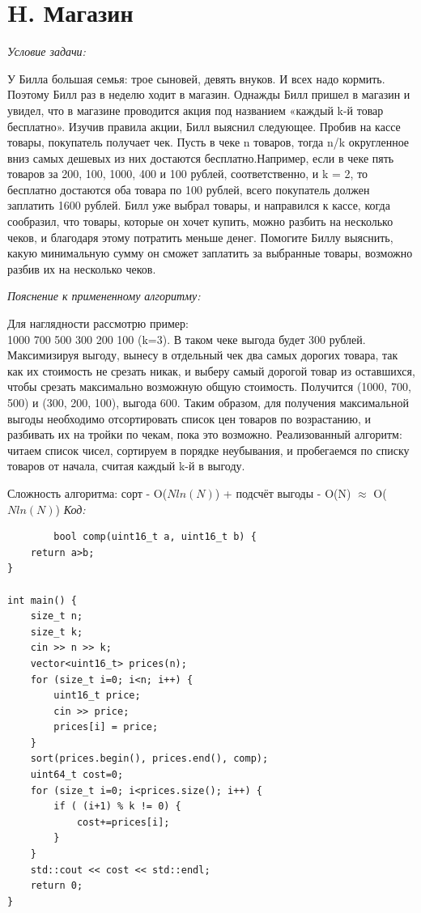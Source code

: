 \section{H. Магазин}
\textit{Условие задачи:} \par
У Билла большая семья: трое сыновей, девять внуков. И всех надо кормить. Поэтому Билл раз в неделю ходит в магазин.
Однажды Билл пришел в магазин и увидел, что в магазине проводится акция под названием «каждый k-й товар бесплатно».
Изучив правила акции, Билл выяснил следующее. Пробив на кассе товары, покупатель получает чек. Пусть в чеке n товаров,
тогда n/k округленное вниз самых дешевых из них достаются бесплатно.Например, если в чеке пять товаров за 200, 100, 1000,
400 и 100 рублей, соответственно, и k = 2, то бесплатно достаются оба товара по 100 рублей, всего покупатель должен заплатить 1600 рублей.
Билл уже выбрал товары, и направился к кассе, когда сообразил, что товары, которые он хочет купить, можно разбить на несколько
чеков, и благодаря этому потратить меньше денег. Помогите Биллу выяснить, какую минимальную сумму он сможет заплатить за
выбранные товары, возможно разбив их на несколько чеков.\par
\textit{Пояснение к примененному алгоритму:} \par
Для наглядности рассмотрю пример:\\
1000 700 500 300 200 100 (k=3). В таком чеке выгода будет 300 рублей. Максимизируя выгоду, вынесу в отдельный чек два самых
дорогих товара, так как их стоимость не срезать никак, и выберу самый дорогой товар из оставшихся, чтобы срезать максимально
возможную общую стоимость. Получится (1000, 700, 500) и (300, 200, 100), выгода 600. Таким образом, для получения максимальной выгоды
необходимо отсортировать список цен товаров по возрастанию, и разбивать их на тройки по чекам, пока это возможно.
Реализованный алгоритм: читаем список чисел, сортируем в порядке неубывания, и пробегаемся по списку товаров от начала,
считая каждый k-й в выгоду.\par
Сложность алгоритма: сорт - O($Nln(N)$) + подсчёт выгоды - O(N) $\approx$ O($Nln(N)$)
\BgThispage
\newpage
\textit{Код:}
\small
\begin{center}
    \begin{verbatim}
        bool comp(uint16_t a, uint16_t b) {
    return a>b;
}

int main() {
    size_t n;
    size_t k;
    cin >> n >> k;
    vector<uint16_t> prices(n);
    for (size_t i=0; i<n; i++) {
        uint16_t price;
        cin >> price;
        prices[i] = price;
    }
    sort(prices.begin(), prices.end(), comp);
    uint64_t cost=0;
    for (size_t i=0; i<prices.size(); i++) {
        if ( (i+1) % k != 0) {
            cost+=prices[i];
        }
    }
    std::cout << cost << std::endl;
    return 0;
}
    \end{verbatim}
\end{center}
\BgThispage
